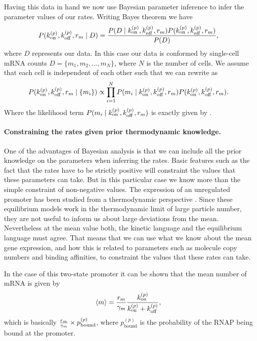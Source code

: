 Having this data in hand we now use Bayesian parameter inference to infer the
parameter values of our rates. Writing Bayes theorem we have
\begin{equation}
  P(k^{(p)}_{\text{on}}, k^{(p)}_{\text{off}}, r_m \mid D) = {P(D \mid k^{(p)}_{\text{on}}, k^{(p)}_{\text{off}}, r_m)
  P(k^{(p)}_{\text{on}}, k^{(p)}_{\text{off}}, r_m) \over P(D)},
  \label{eq_bayes_rnap_rates}
\end{equation}
where $D$ represents our data. In this case our data is conformed by single-cell
mRNA counts $D = \{ m_1, m_2, \ldots, m_N \}$, where $N$ is the number of cells.
We assume that each cell is independent of each other such that we can rewrite
 as
\begin{equation}
  P(k^{(p)}_{\text{on}}, k^{(p)}_{\text{off}}, r_m \mid \{m_i\}) \propto
  \prod_{i=1}^N P(m_i \mid k^{(p)}_{\text{on}}, k^{(p)}_{\text{off}}, r_m)
  P(k^{(p)}_{\text{on}}, k^{(p)}_{\text{off}}, r_m).
  \label{eq_bayes_sample}
\end{equation}
Where the likelihood term $P(m_i \mid k^{(p)}_{\text{on}}, k^{(p)}_{\text{off}}, r_m)$ is exactly given by
.

\paragraph{Constraining the rates given prior thermodynamic knowledge.}

One of the advantages of Bayesian analysis is that we can include all the prior
knowledge on the parameters when inferring the rates. Basic features such as the
fact that the rates have to be strictly positive will constraint the values that
these parameters can take. But in this particular case we know more than the
simple constraint of non-negative values. The expression of an unregulated
promoter has been studied from a thermodynamic perspective \cite{Brewster2012}.
Since these equilibrium models work in the thermodynamic limit of large particle
number, they are not useful to inform us about large deviations from the mean.
Nevertheless at the mean value both, the kinetic language and the equilibrium
language must agree. That means that we can use what we know about the mean gene
expression, and how this is related to parameters such as molecule copy numbers
and binding affinities, to constraint the values that these rates can take.

In the case of this two-state promoter it can be shown that the mean number of
mRNA is given by \cite{Phillips2015}
\begin{equation}
  \left\langle m \right\rangle = {r_m \over \gamma _m} {k^{(p)}_{\text{on}} \over k^{(p)}_{\text{on}} + k^{(p)}_{\text{off}}},
\end{equation}
which is basically ${r_m \over \gamma _m} \times p_{\text{bound}}^{(p)}$, where
$p_{\text{bound}}^{(p)}$ is the probability of the RNAP being bound at the
promoter.

